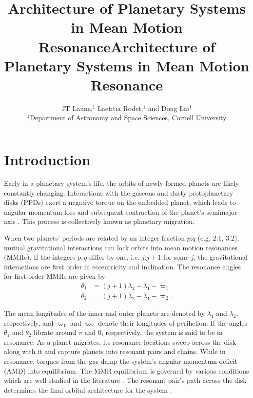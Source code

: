 \documentclass{mnras}
\title[MMR Architecture]{Architecture of Planetary Systems in Mean Motion Resonance}
\author[Laune et al.]{
JT Laune,$^{1}$
Laetitia Rodet,$^{1}$
and Dong Lai$^{1}$
\\
$^{1}$Department of Astronomy and Space Sciences, Cornell University\\}
\date{}
\title{Architecture of Planetary Systems in Mean Motion Resonance}
\begin{document}
\maketitle
\maketitle

\section{Introduction}
\label{sec:org7f69f9b}

Early in a planetary system’s life, the orbits of newly formed planets
are likely constantly changing.  Interactions with the gaseous and
dusty protoplanetary disks (PPDs) exert a negative torque on the
embedded planet, which leads to angular momentum loss and subsequent
contraction of the planet’s semimajor axis
\cite{nelson_planetary_2018}. This process is collectively known as
planetary migration.

When two planets' periods are related by an integer fraction \(p\):\(q\)
(e.g. 2:1, 3:2), mutual gravitational interactions can lock orbits
into mean motion resonances (MMRs).
If the integers \(p,q\) differ by one, i.e. \(j\):\(j+1\) for some \(j\),
the gravitational interactions are first order in eccentricity
and inclination.
The resonance angles for first order MMRs are given by
\begin{align}
\label{circangles}
 \theta_1 &= (j+1)\lambda_2 - \lambda_1 - \varpi_1 \\
 \theta_2 &= (j+1)\lambda_2 - \lambda_1 - \varpi_2.
\end{align}

The mean longitudes of the inner and outer planets are denoted by
\(\lambda_1\) and \(\lambda_2\), respectively, and \(\varpi_1\) and
\(\varpi_2\) denote their longitudes of perihelion.  If the angles
\(\theta_1\) and \(\theta_2\) librate around \(\pi\) and \(0\), respectively,
the system is said to be in resonance.  As a planet migrates, its
resonance locations sweep across the disk along with it and capture
planets into resonant pairs and chains.
While in resonance, torques from the gas damp the
system's angular momentum deficit (AMD) into equilibrium.  The MMR
equilibrium is governed by various conditions which are well studied
in the literature
\cite{henrard_second_1983,deck_migration_2015,goldreich_overstable_2014,xu_migration_2018,henrard_second_1983}.
The resonant pair's path across the disk determines the final orbital
architecture for the system
\cite{cresswell_evolution_2006,cresswell_three-dimensional_2008}.
\end{document}
